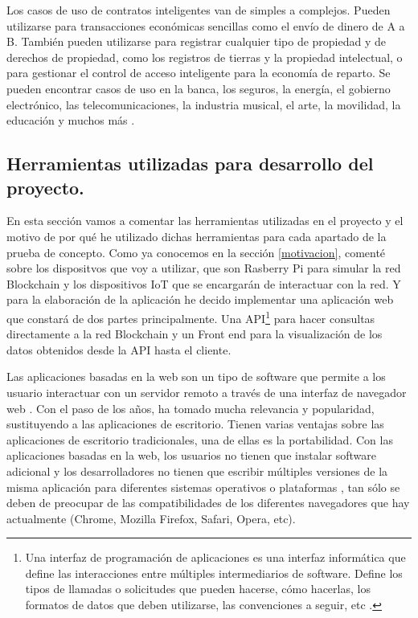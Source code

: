 Los casos de uso de contratos inteligentes van de simples a complejos. Pueden utilizarse para transacciones económicas 
sencillas como el envío de dinero de A a B. También pueden utilizarse para registrar cualquier tipo de propiedad y de 
derechos de propiedad, como los registros de tierras y la propiedad intelectual, o para gestionar el control de acceso 
inteligente para la economía de reparto. Se pueden encontrar casos de uso en la banca, los seguros, la energía, el 
gobierno electrónico, las telecomunicaciones, la industria musical, el arte, la movilidad, la educación y muchos más 
\cite{what-is-smart-contract}.

\subsection{Herramientas utilizadas para desarrollo del proyecto.}

En esta sección vamos a comentar las herramientas utilizadas en el proyecto y el motivo de por qué he utilizado dichas
herramientas para cada apartado de la prueba de concepto. Como ya conocemos en la sección \ref{motivacion}, comenté 
sobre los dispositvos que voy a utilizar, que son Rasberry Pi para simular la red Blockchain y los dispositivos IoT que 
se encargarán de interactuar con la red. Y para la elaboración de la aplicación he decido implementar una aplicación 
web que constará de dos partes principalmente. Una API\footnote{Una interfaz de programación de aplicaciones es una 
interfaz informática que define las interacciones entre múltiples intermediarios de software. Define los tipos de 
llamadas o solicitudes que pueden hacerse, cómo hacerlas, los formatos de datos que deben utilizarse, las convenciones 
a seguir, etc \cite{api}.\label{fnlabel}} para hacer consultas directamente a la red Blockchain y un Front end para la 
visualización de los datos obtenidos desde la API hasta el cliente. 

\vspace{5mm}

\noindent Las aplicaciones basadas en la web son un tipo de software que permite a los usuario interactuar con un 
servidor remoto a través de una interfaz de navegador web \cite{web-based-app}. Con el paso de los años, ha tomado 
mucha relevancia y popularidad, sustituyendo a las aplicaciones de escritorio. Tienen varias ventajas sobre las 
aplicaciones de escritorio tradicionales, una de ellas es la portabilidad. Con las aplicaciones basadas en la web, 
los usuarios no tienen que instalar software adicional y los desarrolladores no tienen que escribir múltiples versiones 
de la misma aplicación para diferentes sistemas operativos o plataformas \cite{web-based-app}, tan sólo se deben de 
preocupar de las compatibilidades de los diferentes navegadores que hay actualmente (Chrome, Mozilla Firefox, Safari, 
Opera, etc).

